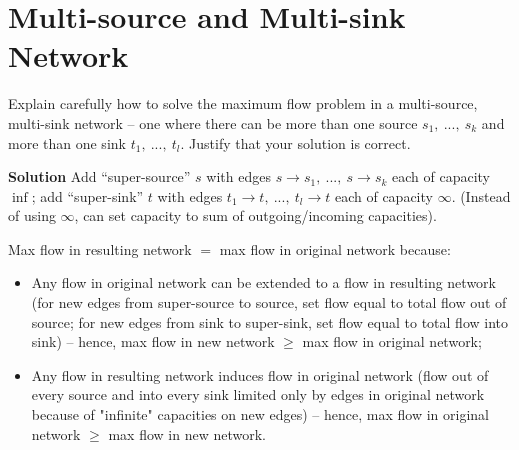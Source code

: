 \documentclass{article}
\begin{document}
\section{Multi-source and Multi-sink Network}
Explain carefully how to solve the maximum flow problem in a
multi-source, multi-sink network -- one where there can be more than one
source $s_1,~...,~s_k$ and more than one sink $t_1,~...,~t_l$. Justify that your
solution is correct.

{\bf Solution} 
Add ``super-source'' $s$ with edges $s \rightarrow s_1,~...,~s\rightarrow s_k$
each of capacity $\inf$; add ``super-sink'' $t$ with edges 
$t_1 \rightarrow t,~...,~ t_l \rightarrow t$ each of capacity $\infty$. 
(Instead of using $\infty$, can set capacity to sum of outgoing/incoming
capacities).

Max flow in resulting network $=$ max flow in original network because:
\begin{itemize}
\item Any flow in original network can be extended to a flow in resulting
network (for new edges from super-source to source, set flow equal to
total flow out of source; for new edges from sink to super-sink, set
flow equal to total flow into sink) -- hence, max flow in new network
$\ge$ max flow in original network;
\item Any flow in resulting network induces flow in original network (flow
out of every source and into every sink limited only by edges in
original network because of "infinite" capacities on new edges) -- 
hence, max flow in original network $\ge$ max flow in new network.
\end{itemize}
\end{document}

